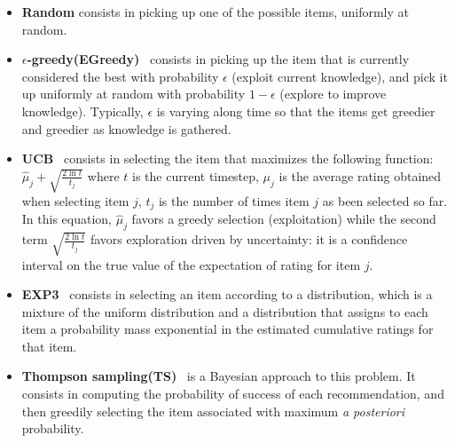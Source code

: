 \documentclass[twoside,leqno,twocolumn]{article}
\begin{document}
\begin{itemize}
  \item \textbf{Random} consists in picking up one of the possible items, uniformly at random.
  \item \textbf{$\epsilon$-greedy(EGreedy)}~\cite{Auer:2002:FAM:599614.599677} consists in picking up the item that is currently considered the best with probability $\epsilon$ (exploit current knowledge), and pick it up uniformly at random with probability $1-\epsilon$ (explore to improve knowledge). Typically, $\epsilon$ is varying along time so that the items get greedier and greedier as knowledge is gathered.
  \item \textbf{UCB}~\cite{Auer:2002:FAM:599614.599677} consists in selecting the item that maximizes the following function: $\hat\mu_j + \sqrt{\frac{2\ln t}{t_j}}$ where $t$ is the current timestep, $\mu_j$ is the average rating obtained when selecting item $j$, $t_j$ is the number of times item $j$ as been selected so far. In this equation, $\hat\mu_j$ favors a greedy selection (exploitation) while the second term $\sqrt{\frac{2\ln t}{t_j}}$ favors exploration driven by uncertainty: it is a confidence interval on the true value of the expectation of rating for item $j$.
 


  \item \textbf{EXP3}~\cite{DBLP:journals/siamcomp/AuerCFS02} consists in selecting an item according to a distribution, which is a mixture of the uniform distribution and a distribution that assigns to each item a probability mass exponential in the estimated cumulative ratings for that item. 
  \item \textbf{Thompson sampling(TS)}~\cite{DBLP:journals/corr/abs-1209-3352} is a Bayesian approach to this problem. It consists in computing the probability of success of each recommendation, and then greedily selecting the item associated with maximum \textit{a posteriori} probability.
\end{itemize}
\end{document}
